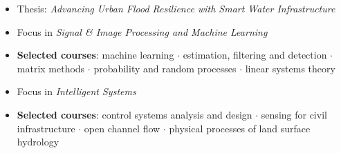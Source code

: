 \documentclass[10pt,a4paper,ragged2e]{altacv}
\begin{document}
\vspace{4pt}


\vspace{4pt}




\begin{itemize}
\item Thesis: \textit{Advancing Urban Flood Resilience with Smart Water Infrastructure}
\end{itemize}

\divider

\begin{itemize}
  \item Focus in \textit{Signal \& Image Processing and Machine Learning}
  \item \textbf{Selected courses}: machine learning $\cdot$ estimation, filtering and detection $\cdot$ matrix methods $\cdot$ probability and random processes $\cdot$ linear systems theory 
\end{itemize}

\divider

\begin{itemize}
  \item Focus in \textit{Intelligent Systems}
  \item \textbf{Selected courses}: control systems analysis and design $\cdot$ sensing for civil infrastructure $\cdot$ open channel flow $\cdot$ physical processes of land surface hydrology
\end{itemize}
\end{document}
